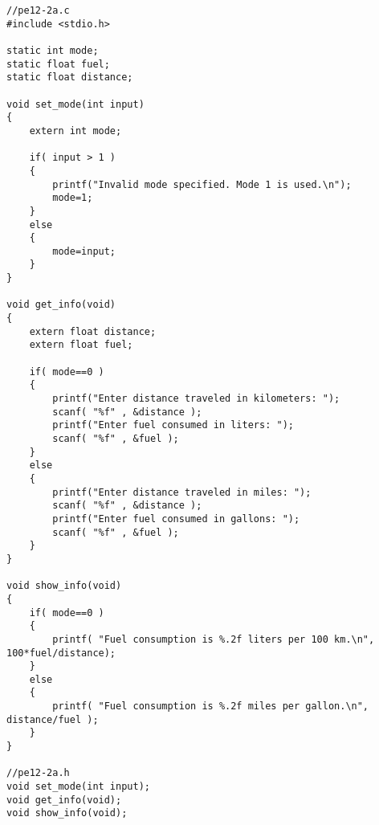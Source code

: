\begin{solution}
  \begin{verbatim}
//pe12-2a.c
#include <stdio.h>

static int mode;
static float fuel;
static float distance;

void set_mode(int input)
{
	extern int mode;

	if( input > 1 )
	{
		printf("Invalid mode specified. Mode 1 is used.\n");
		mode=1;
	}
	else
	{
		mode=input;
	}
}

void get_info(void)
{
	extern float distance;
	extern float fuel;

	if( mode==0 )
	{
		printf("Enter distance traveled in kilometers: ");
		scanf( "%f" , &distance );
		printf("Enter fuel consumed in liters: ");
		scanf( "%f" , &fuel );
	}
	else
	{
		printf("Enter distance traveled in miles: ");
		scanf( "%f" , &distance );
		printf("Enter fuel consumed in gallons: ");
		scanf( "%f" , &fuel );
	}
}

void show_info(void)
{
	if( mode==0 )
	{
		printf( "Fuel consumption is %.2f liters per 100 km.\n", 100*fuel/distance);
	}
	else
	{
		printf( "Fuel consumption is %.2f miles per gallon.\n", distance/fuel );
	}
}

//pe12-2a.h
void set_mode(int input);
void get_info(void);
void show_info(void);
  \end{verbatim}
\end{solution}

